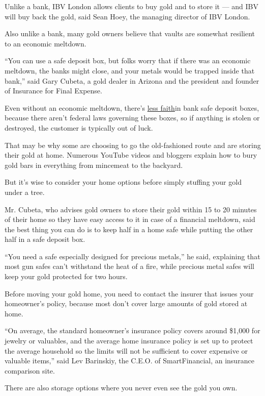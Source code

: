 Unlike a bank, IBV London allows clients to buy gold and to store it ---
and IBV will buy back the gold, said Sean Hoey, the managing director of
IBV London.

Also unlike a bank, many gold owners believe that vaults are somewhat
resilient to an economic meltdown.

``You can use a safe deposit box, but folks worry that if there was an
economic meltdown, the banks might close, and your metals would be
trapped inside that bank,'' said Gary Cubeta, a gold dealer in Arizona
and the president and founder of Insurance for Final Expense.

Even without an economic meltdown, there's
\href{https://www.nytimes3xbfgragh.onion/2019/07/19/business/safe-deposit-box-theft.html}{less
faith}in bank safe deposit boxes, because there aren't federal laws
governing these boxes, so if anything is stolen or destroyed, the
customer is typically out of luck.

That may be why some are choosing to go the old-fashioned route and are
storing their gold at home. Numerous YouTube videos and bloggers explain
how to bury gold bars in everything from mincemeat to the backyard.

But it's wise to consider your home options before simply stuffing your
gold under a tree.

Mr. Cubeta, who advises gold owners to store their gold within 15 to 20
minutes of their home so they have easy access to it in case of a
financial meltdown, said the best thing you can do is to keep half in a
home safe while putting the other half in a safe deposit box.

``You need a safe especially designed for precious metals,'' he said,
explaining that most gun safes can't withstand the heat of a fire, while
precious metal safes will keep your gold protected for two hours.

Before moving your gold home, you need to contact the insurer that
issues your homeowner's policy, because most don't cover large amounts
of gold stored at home.

``On average, the standard homeowner's insurance policy covers around
\$1,000 for jewelry or valuables, and the average home insurance policy
is set up to protect the average household so the limits will not be
sufficient to cover expensive or valuable items,'' said Lev Barinskiy,
the C.E.O. of SmartFinancial, an insurance comparison site.

There are also storage options where you never even see the gold you
own.

